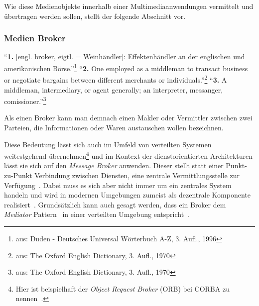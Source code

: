 
  Wie diese Medienobjekte innerhalb einer Multimediaanwendungen vermittelt und übertragen werden sollen, stellt der folgende Abschnitt vor.


\subsubsection{Medien Broker} %
\label{ssub:media_broker}

  \begin{definition}[Broker]\label{def:broker}
    "`\textbf{1.} [engl. broker, eigtl. = Weinhändler]: Effektenhändler an der englischen und amerikanischen Börse."'\footnote{aus: Duden - Deutsches Universal Wörterbuch A-Z, 3. Aufl., 1996} "`\textbf{2.} One employed as a middleman to transact business or negotiate bargains between different merchants or individuals."'\footnote{aus: The Oxford English Dictionary, 3. Aufl., 1970} "`\textbf{3.} A middleman, intermediary, or agent generally; an interpreter, messanger, comissioner."'\footnote{aus: The Oxford English Dictionary, 3. Aufl., 1970}
  \end{definition}

  Als einen Broker kann man demnach einen Makler oder Vermittler zwischen zwei Parteien, die Informationen oder Waren austauschen wollen bezeichnen.

  Diese Bedeutung lässt sich auch im Umfeld von verteilten Systemen weitestgehend über\-nehmen\footnote{Hier ist beispielhaft der \emph{Object Request Broker} (ORB) bei CORBA zu nennen~\citep{coulouris2001ds,balzert1999lo}.} und im Kontext der dienstorientierten Architekturen lässt sie sich auf den \emph{Message Broker} anwenden. Dieser stellt statt einer Punkt-zu-Punkt Verbindung zwischen Diensten, eine zentrale Vermittlungsstelle zur Verfügung~\citep[S. 71]{web_services}. Dabei muss es sich aber nicht immer um ein zentrales System handeln und wird in modernen Umgebungen zumeist als dezentrale Komponente realisiert~\citep{enterprise_service_bus}. Grundsätzlich kann auch gesagt werden, dass ein Broker dem \emph{Mediator} Pattern~\citep[S. 273]{design_patterns} in einer verteilten Umgebung entspricht~\citep[S. 83]{enterprise_integration_patterns}.
  
